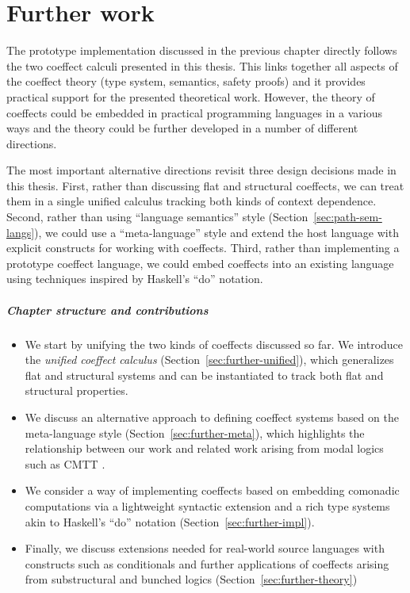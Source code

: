 \chapter{Further work}
\label{ch:further}

The prototype implementation discussed in the previous chapter directly follows the two
coeffect calculi presented in this thesis. This links together all aspects of the coeffect
theory (type system, semantics, safety proofs) and it provides practical support for the
presented theoretical work. However, the theory of coeffects could be embedded in practical
programming languages in a various ways and the theory could be further developed in a number
of different directions.

The most important alternative directions revisit three design decisions made in this thesis.
First, rather than discussing flat and structural coeffects, we can treat them in a single
unified calculus tracking both kinds of context dependence. Second, rather than using ``language
semantics'' style (Section~\ref{sec:path-sem-langs}), we could use a ``meta-language'' style
and extend the host language with explicit constructs for working with coeffects. Third,
rather than implementing a prototype coeffect language, we could embed coeffects into an
existing language using techniques inspired by Haskell's ``do'' notation.

\paragraph{Chapter structure and contributions}
\begin{itemize}
\item We start by unifying the two kinds of coeffects discussed so far. We introduce the
  \emph{unified coeffect calculus} (Section~\ref{sec:further-unified}), which generalizes flat
  and structural systems and can be instantiated to track both flat and structural properties.

\item We discuss an alternative approach to defining coeffect systems based on the meta-language
  style (Section~\ref{sec:further-meta}), which highlights the relationship between our work and
  related work arising from modal logics such as CMTT \cite{logic-cmtt}.

\item We consider a way of implementing coeffects based on embedding comonadic computations
  via a lightweight syntactic extension and a rich type systems akin to Haskell's ``do'' notation
  (Section~\ref{sec:further-impl}).

\item Finally, we discuss extensions needed for real-world source languages with constructs
  such as conditionals and further applications of coeffects arising from substructural and bunched
  logics (Section~\ref{sec:further-theory})
\end{itemize}

